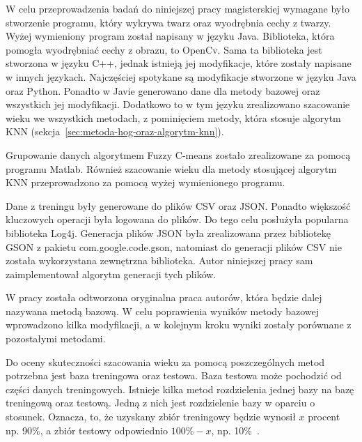 \documentclass[a4paper,twoside,12pt]{book}
\begin{document}
    W celu przeprowadzenia badań do niniejszej pracy magisterskiej wymagane było stworzenie programu,
    który wykrywa twarz oraz wyodrębnia cechy z twarzy. Wyżej wymieniony program został napisany w języku Java.
    Biblioteka, która pomogła wyodrębniać cechy z obrazu, to OpenCv. Sama ta biblioteka jest stworzona w języku C++, jednak
    istnieją jej modyfikacje, które zostały napisane w innych językach. Najczęściej spotykane są modyfikacje
    stworzone w języku Java oraz Python. Ponadto w Javie generowano dane dla metody bazowej oraz wszystkich
    jej modyfikacji. Dodatkowo to w tym języku zrealizowano szacowanie wieku we wszystkich metodach, z
    pominięciem metody, która stosuje algorytm KNN (sekcja~\ref{sec:metoda-hog-oraz-algorytm-knn}).

    Grupowanie danych algorytmem Fuzzy C-means zostało zrealizowane za pomocą programu Matlab.
    Również szacowanie wieku dla metody stosującej algorytm KNN przeprowadzono za pomocą wyżej wymienionego
    programu.

    Dane z treningu były generowane do plików CSV oraz JSON. Ponadto większość kluczowych operacji była logowana do plików. Do
    tego celu posłużyła popularna biblioteka Log4j.
    Generacja plików JSON była zrealizowana przez bibliotekę GSON z pakietu com.google.code.gson, natomiast
    do generacji plików CSV nie została wykorzystana zewnętrzna biblioteka.
    Autor niniejszej pracy sam zaimplementował algorytm generacji tych plików.

    W pracy została odtworzona oryginalna praca autorów, która
    będzie dalej nazywana metodą bazową.
    W celu poprawienia wyników metody bazowej wprowadzono kilka modyfikacji, a
    w kolejnym kroku wyniki zostały porównane z pozostałymi metodami.

    Do oceny skuteczności szacowania wieku za pomocą poszczególnych metod potrzebna jest baza treningowa oraz testowa.
    Baza testowa może pochodzić od części danych treningowych. Istnieje kilka metod rozdzielenia jednej bazy na bazę
    treningową oraz testową.
    Jedną z nich jest rozdzielenie bazy w oparciu o stosunek. Oznacza, to, że uzyskany zbiór treningowy będzie wynosił
    $x$ procent np. 90\%, a zbiór testowy odpowiednio $100\% -x$, np. 10\%~\cite{dataMiningAlgorithms}.
\end{document}
